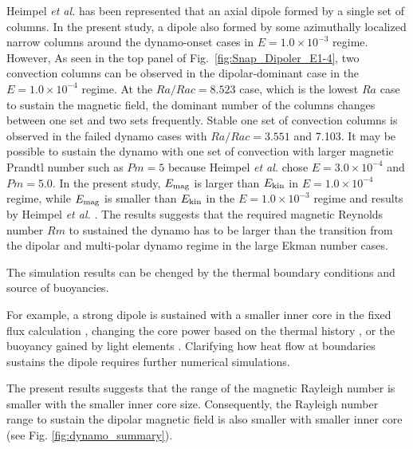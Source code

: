 {\color{blue}
Heimpel {\it et al.}  has been represented that an axial dipole formed by a single set of columns. 
In the present study, a dipole also formed by some azimuthally localized narrow columns around the dynamo-onset cases in $E = 1.0 \times 10^{-3}$ regime. However, As seen in the top panel of Fig.~\ref{fig:Snap_Dipoler_E1-4}, two convection columns can be observed in the dipolar-dominant case in the $E = 1.0 \times 10^{-4}$ regime. At the $Ra/Rac = 8.523$ case, which is the lowest $Ra$ case to sustain the magnetic field, the dominant number of the columns changes between one set and two sets frequently. Stable one set of convection columns is observed in the failed dynamo cases with $Ra/Rac = 3.551$ and 7.103. It may be possible to sustain the dynamo with one set of convection with larger magnetic Prandtl number such as $Pm = 5$ because Heimpel {\it et al.}  chose $E = 3.0 \times 10^{-4}$ and $Pm = 5.0$. In the present study, $E_{\rm mag}$ is larger than $E_{\rm kin}$ in $E = 1.0 \times 10^{-4}$ regime, while $E_{\rm mag}$ is smaller than $E_{\rm kin}$ in the $E = 1.0 \times 10^{-3}$ regime and results by Heimpel {\it et al.} . The results suggests that the required magnetic Reynolds number $Rm$ to sustained the dynamo has to be larger than the transition from the dipolar and multi-polar dynamo regime in the large Ekman number cases.

The simulation results can be chenged by the thermal boundary conditions and source of buoyancies. 
}
For example, a strong dipole is sustained with a smaller inner core in the fixed flux calculation \cite{Hori:2010}, changing the core power based on the thermal history \cite{Driscoll:2016}, or the buoyancy gained by light elements \cite{Lhuillier:2019}. Clarifying how heat flow at boundaries sustains the dipole requires further numerical simulations.

{\color{blue}
The present results suggests that the range of the magnetic Rayleigh number is smaller with the smaller inner core size. Consequently, the Rayleigh number range to sustain the dipolar magnetic field is also smaller with smaller inner core (see Fig. \ref{fig:dynamo_summary}).
}


